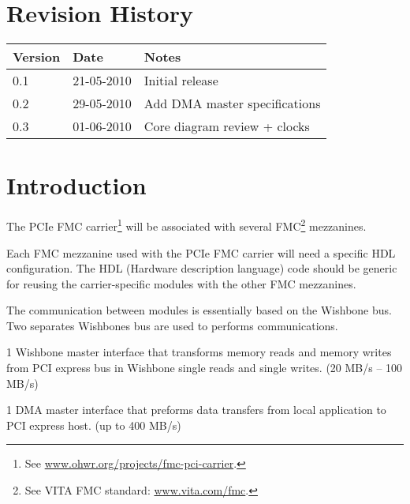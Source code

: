 \documentclass[10pt,a4paper]{cerndoc}
\begin{document}
  \cerntitle
  \section*{Revision History}
  \begin{tabularx}{\textwidth}{|p{3cm}|p{3cm}|X|}
    \hline \textbf{Version}&\textbf{Date}&\textbf{Notes}\\ \hline \hline
    0.1 & 21-05-2010 & Initial release\\ \hline
    0.2 & 29-05-2010 & Add DMA master specifications\\ \hline
    0.3 & 01-06-2010 & Core diagram review + clocks\\ \hline

  \end{tabularx}

  \tableofcontents
  \listoffigures
  \listoftables
  \clearpage


  \section{Introduction}
The PCIe FMC carrier\footnote{See \href{http://www.ohwr.org/projects/fmc-pci-carrier}{www.ohwr.org/projects/fmc-pci-carrier}.} will be associated with several FMC\footnote{See VITA FMC standard: \href{http://www.vita.com/fmc}{www.vita.com/fmc}.} mezzanines. 

Each FMC mezzanine used with the PCIe FMC carrier will need a specific HDL configuration. The HDL (Hardware description language) code should be generic for reusing the carrier-specific modules with the other FMC mezzanines. 

 The communication between modules is essentially based on the Wishbone bus. Two separates Wishbones bus are used to performs communications.
 
 \begin{packed_item}
\item 1 Wishbone master interface that transforms memory reads and memory writes from PCI express bus in Wishbone single reads and single writes. (20 MB/s -- 100 MB/s)
\item 1 DMA master interface that preforms data transfers from local application to PCI express host. (up to 400 MB/s)

\end{packed_item}
\end{document}
